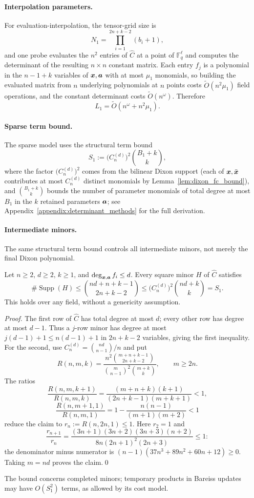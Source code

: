 \paragraph{Interpolation parameters.}
For evaluation-interpolation, the tensor-grid size is
\[
N_1=\prod_{i=1}^{2n+k-2}(b_i+1),
\]
and one probe evaluates the $n^2$ entries of $\widehat{C}$ at a point of $\mathbb{F}_q^{\ell}$ and computes the determinant of the resulting $n\times n$ constant matrix. Each entry $f_j$ is a polynomial in the $n-1+k$ variables of ${\boldsymbol{x}},{\boldsymbol{a}}$ with at most $\mu_1$ monomials, so building the evaluated matrix from $n$ underlying polynomials at $n$ points costs $\widetilde{O}(n^2\mu_1)$ field operations, and the constant determinant costs $\widetilde{O}(n^\omega)$. Therefore
\[
L_1 = \widetilde{O}(n^\omega + n^2\mu_1).
\]

\paragraph{Sparse term bound.}
The sparse model uses the structural term bound
\[
S_1 := \bigl(C_n^{(d)}\bigr)^2\binom{B_1+k}{k},
\]
where the factor $\bigl(C_n^{(d)}\bigr)^2$ comes from the bilinear Dixon support (each of ${\boldsymbol{x}},\bar{{\boldsymbol{x}}}$ contributes at most $C_n^{(d)}$ distinct monomials by Lemma~\ref{lem:dixon_fc_bound}), and $\binom{B_1+k}{k}$ bounds the number of parameter monomials of total degree at most $B_1$ in the $k$ retained parameters ${\boldsymbol{a}}$; see Appendix~\ref{appendix:determinant_methods} for the full derivation.

\paragraph{Intermediate minors.}
The same structural term bound controls all intermediate minors, not merely the final Dixon polynomial.
\begin{lemma}\label{lem:intermediate_support}
Let $n\ge2$, $d\ge2$, $k\ge1$, and $\deg_{{\boldsymbol{x}},{\boldsymbol{a}}}f_i\le d$.
Every square minor $H$ of $\widehat C$ satisfies
\[
 \#\operatorname{Supp}(H)
 \le\binom{nd+n+k-1}{2n+k-2}
 \le \bigl(C_n^{(d)}\bigr)^2\binom{nd+k}{k}=S_1.
\]
This holds over any field, without a genericity assumption.
\end{lemma}
\begin{proof}
The first row of $\widehat C$ has total degree at most $d$; every other row has degree at most $d-1$. Thus a $j$-row minor has degree at most $j(d-1)+1\le n(d-1)+1$ in $2n+k-2$ variables, giving the first inequality.
For the second, use $C_n^{(d)}=\binom{nd}{n-1}/n$ and put
\[
 R(n,m,k)=\frac{n^2\binom{m+n+k-1}{2n+k-2}}
 {\binom{m}{n-1}^2\binom{m+k}{k}},\qquad m\ge2n.
\]
The ratios
\[
 \frac{R(n,m,k+1)}{R(n,m,k)}
 =\frac{(m+n+k)(k+1)}{(2n+k-1)(m+k+1)}<1,
\]
\[
 \frac{R(n,m+1,1)}{R(n,m,1)}
 =1-\frac{n(n-1)}{(m+1)(m+2)}<1
\]
reduce the claim to $r_n:=R(n,2n,1)\le1$. Here $r_2=1$ and
\[
 \frac{r_{n+1}}{r_n}
 =\frac{(3n+1)(3n+2)(3n+3)(n+2)}
 {8n(2n+1)^2(2n+3)}\le1:
\]
the denominator minus numerator is
$(n-1)(37n^3+89n^2+60n+12)\ge0$.
Taking $m=nd$ proves the claim.\qed
\end{proof}
The bound concerns completed minors; temporary products in Bareiss updates may have $O(S_1^2)$ terms, as allowed by its cost model.

